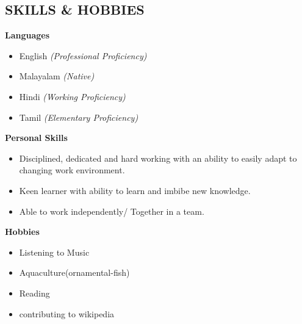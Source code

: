 \documentclass[line,margin]{res}
\begin{document}
\begin{resume}
  \section{SKILLS \& HOBBIES}
  \textbf{ Languages}
  \begin{itemize} \itemsep -2pt
  \item English \textit{(Professional Proficiency)}
  \item Malayalam \textit{(Native)}
  \item Hindi \textit{(Working Proficiency)}
  \item Tamil \textit{(Elementary Proficiency)}
  \end{itemize}
  \textbf{ Personal Skills}
  \begin{itemize} \itemsep -2pt
  \item Disciplined, dedicated and hard working with an ability to easily adapt to changing work environment.
  \item Keen learner with ability to learn and imbibe new knowledge.
  \item Able to work independently/ Together in a team.
  \end{itemize}
  \textbf{ Hobbies}
  \begin{itemize} \itemsep -2pt
  \item Listening to Music
  \item Aquaculture(ornamental-fish)
  \item Reading
  \item contributing to wikipedia
  \end{itemize}
  \vspace{10 mm}

\end{resume}
\end{document}
